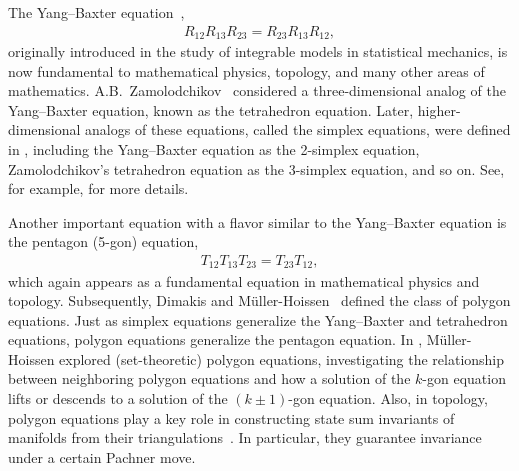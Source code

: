 \documentclass[pdftex]{sigma}
\numberwithin{equation}{section}
\theoremstyle{definition}
\begin{document}
The Yang--Baxter equation~\cite{baxter1972partition, yang1967some},
\begin{align*}
 R_{12}R_{13}R_{23}=R_{23}R_{13}R_{12},
\end{align*}
originally introduced in the study of integrable models in statistical mechanics, is now fundamental to mathematical physics, topology, and many other areas of mathematics. A.B.~Zamolodchikov~\cite{zamolodchikov1980tetrahedra,zamolodchikov1981tetrahedron} considered a three-dimensional analog of the Yang--Baxter equation, known as the tetrahedron equation.
Later, higher-dimensional analogs of these equations, called the simplex equations, were defined in \cite{bazhanov1982conditions}, including the Yang--Baxter equation as the 2-simplex equation, Zamolodchikov's tetrahedron equation as the 3-simplex equation, and so on. See, for example, \cite{bardakov2024set, carter1996formulations,dimakis2015simplex, jimbo1989introduction,
korepanov2016cohomologies,maillet1989tetrahedron} for more details.

Another important equation with a flavor similar to the Yang--Baxter equation is the pentagon (5-gon) equation,
\begin{align*}
 T_{12}T_{13}T_{23}=T_{23}T_{12},
\end{align*}
which again appears as a fundamental equation in mathematical physics and topology. Subsequently, Dimakis and M\"uller-Hoissen~\cite{dimakis2015simplex} defined the class of polygon equations. Just as simplex equations generalize the Yang--Baxter and tetrahedron equations, polygon equations generalize the pentagon equation. In \cite{muller2024structure}, M\"uller-Hoissen explored (set-theoretic) polygon equations, investigating the relationship between neighboring polygon equations and how a solution of the $k$-gon equation lifts or descends to a solution of the $(k\pm1)$-gon equation. Also, in topology, polygon equations play a key role in constructing state sum invariants of manifolds from their triangulations~\cite{kashaev2018simple,korepanov2024odd, korepanov2017hexagon}. In particular, they guarantee invariance under a certain Pachner move.
\end{document}
